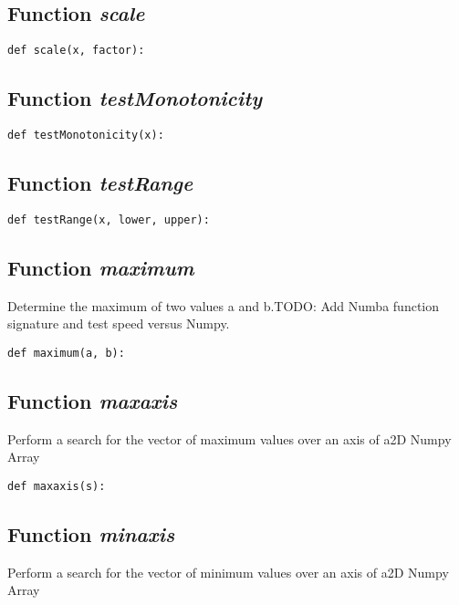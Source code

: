 \documentclass[twoside,11pt]{book}
\begin{document}
\subsection{Function {\it scale}}


\begin{lstlisting}
def scale(x, factor):
\end{lstlisting}

\subsection{Function {\it testMonotonicity}}


\begin{lstlisting}
def testMonotonicity(x):
\end{lstlisting}

\subsection{Function {\it testRange}}


\begin{lstlisting}
def testRange(x, lower, upper):
\end{lstlisting}

\subsection{Function {\it maximum}}
Determine the maximum of two values a and b.TODO: Add Numba function signature and test speed versus Numpy. 

\begin{lstlisting}
def maximum(a, b):
\end{lstlisting}

\subsection{Function {\it maxaxis}}
Perform a search for the vector of maximum values over an axis of a2D Numpy Array 

\begin{lstlisting}
def maxaxis(s):
\end{lstlisting}

\subsection{Function {\it minaxis}}
Perform a search for the vector of minimum values over an axis of a2D Numpy Array 
\end{document}
